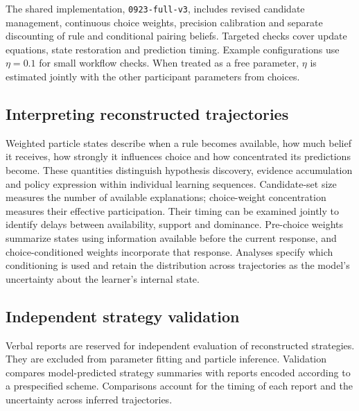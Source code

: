The shared implementation, \texttt{0923-full-v3}, includes revised candidate management, continuous choice weights, precision calibration and separate discounting of rule and conditional pairing beliefs. Targeted checks cover update equations, state restoration and prediction timing. Example configurations use $\eta=0.1$ for small workflow checks. When treated as a free parameter, $\eta$ is estimated jointly with the other participant parameters from choices.


\subsection*{Interpreting reconstructed trajectories}
\label{m:measures}

Weighted particle states describe when a rule becomes available, how much belief it receives, how strongly it influences choice and how concentrated its predictions become. These quantities distinguish hypothesis discovery, evidence accumulation and policy expression within individual learning sequences. Candidate-set size measures the number of available explanations; choice-weight concentration measures their effective participation. Their timing can be examined jointly to identify delays between availability, support and dominance. Pre-choice weights summarize states using information available before the current response, and choice-conditioned weights incorporate that response. Analyses specify which conditioning is used and retain the distribution across trajectories as the model's uncertainty about the learner's internal state.

\subsection*{Independent strategy validation}
\label{m:validation}

Verbal reports are reserved for independent evaluation of reconstructed strategies. They are excluded from parameter fitting and particle inference. Validation compares model-predicted strategy summaries with reports encoded according to a prespecified scheme. Comparisons account for the timing of each report and the uncertainty across inferred trajectories.

